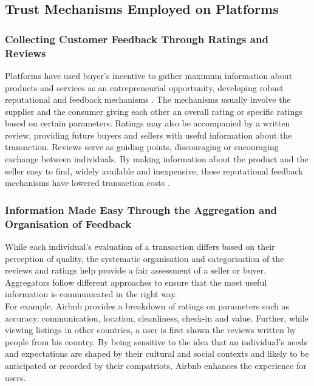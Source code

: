 \documentclass[a4paper, 12pt, twoside]{article}
\begin{document}
                    \newpage
                    
                    \subsection{Trust Mechanisms Employed on Platforms }
\subsubsection{Collecting Customer Feedback Through Ratings and Reviews}
                    
          Platforms have used buyer's incentive to gather maximum information about products and services as an entrepreneurial opportunity, developing robust reputational and feedback mechanisms \parencite{thierer2015internet}. The mechanisms usually involve the supplier and the consumer giving each other an overall rating or specific ratings based on certain parameters. Ratings may also be accompanied by a written review, providing future buyers and sellers with useful information about the transaction. Reviews serve as guiding points, discouraging or encouraging exchange between individuals. By making information about the product and the seller easy to find, widely available and inexpensive, these reputational feedback mechanisms have lowered transaction costs \parencite{EYreport}.

\subsubsection{Information Made Easy Through the Aggregation and Organisation of Feedback}
                    
                    While each individual’s evaluation of a transaction differs based on their perception of quality, the systematic organisation and categorisation of the reviews and ratings help provide a fair assessment of a seller or buyer. Aggregators follow different approaches to ensure that the most useful information is communicated in the right way. \\
                    
                    For example, Airbnb provides a breakdown of ratings on parameters such as accuracy, communication, location, cleanliness, check-in and value. Further, while viewing listings in other countries, a user is first shown the reviews written by people from his country. By being sensitive to the idea that an individual’s needs and expectations are shaped by their cultural and social contexts and likely to be anticipated or recorded by their compatriots, Airbnb enhances the experience for users. \\
\end{document}
